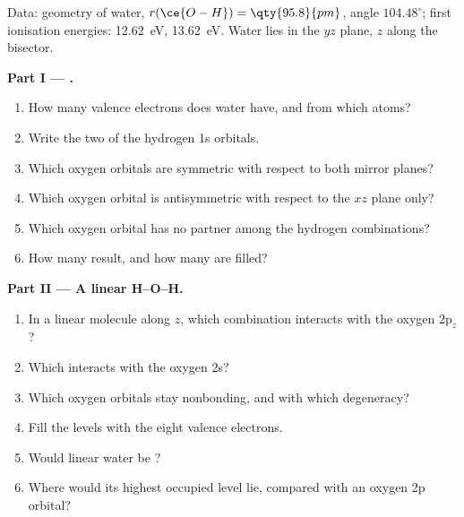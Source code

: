 \begin{problem}
\label{pb:b2:fragment-orbitals:1}
Data: geometry of water, $r(\ce{O-H}) = \qty{95.8}{pm}$, angle
$104.48^\circ$; first ionisation energies:  \qty{12.62}{eV}, 
\qty{13.62}{eV}. Water lies in the $yz$ plane, $z$ along the bisector.

\medskip
\noindent\textbf{Part I --- .}
\begin{enumerate}
  \item How many valence electrons does water have, and from which atoms?
  \item Write the two  of the hydrogen 1s orbitals.
  \item Which oxygen orbitals are symmetric with respect to both mirror planes?
  \item Which oxygen orbital is antisymmetric with respect to the $xz$ plane only?
  \item Which oxygen orbital has no partner among the hydrogen combinations?
  \item How many  result, and how many are filled?
\end{enumerate}

\medskip
\noindent\textbf{Part II --- A linear H--O--H.}
\begin{enumerate}[resume]
  \item In a linear molecule along $z$, which combination interacts with the
        oxygen $2\mathrm p_z$?
  \item Which interacts with the oxygen 2s?
  \item Which oxygen orbitals stay nonbonding, and with which degeneracy?
  \item Fill the levels with the eight valence electrons.
  \item Would linear water be ?
  \item Where would its highest occupied level lie, compared with an oxygen 2p
        orbital?
\end{enumerate}


\end{problem}
